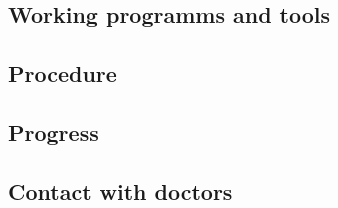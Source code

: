 \documentclass[11pt]{article}
\begin{document}
		\subsection{Working programms and tools}
		
		\subsection{Procedure}
		
		\subsection{Progress}
		
		\subsection{Contact with doctors}
		
	\newpage
	
	\nocite{*}

    \raggedright
    
	
\end{document}
